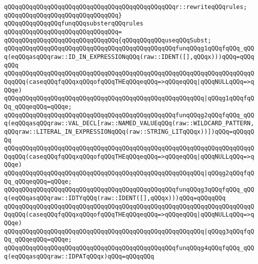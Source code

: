\verb|qQQqqQQqqQQqqQQqqQQqqQQqqQQqqQQqqQQqqQQqqQQqqQQqr::rewriteqQQqrules;|\newline
\verb|qQQqqQQqqQQqqQQqqQQqqQQqqQQqqQQq}|\newline
\newline
\verb|qQQqqQQqqQQqqQQqfunqQQqsubsterqQQqrules|\newline
\verb|qQQqqQQqqQQqqQQqqQQqqQQqqQQqqQQq=|\newline
\verb|qQQqqQQqqQQqqQQqqQQqqQQqqQQqqQQq{qQQqqQQqqQQquseqQQqSubst;|\newline
\newline
\verb|qQQqqQQqqQQqqQQqqQQqqQQqqQQqqQQqqQQqqQQqqQQqqQQqfunqQQqg1qQQqfqQQq_qQQq(eqQQqasqQQqraw::ID_IN_EXPRESSIONqQQq(raw::IDENT([],qQQqx)))qQQq=qQQqqQQq|\newline
\verb|qQQqqQQqqQQqqQQqqQQqqQQqqQQqqQQqqQQqqQQqqQQqqQQqqQQqqQQqqQQqqQQqqQQqqQQqqQQq(caseqQQqfqQQqxqQQqofqQQqTHEqQQqeqQQq=>qQQqeqQQq|\verb#|qQQqNULLqQQq=>qQQqe)#\newline
\verb|qQQqqQQqqQQqqQQqqQQqqQQqqQQqqQQqqQQqqQQqqQQqqQQqqQQqqQQq|\verb#|qQQqg1qQQqfqQQq_qQQqeqQQq=qQQqe;#\newline
\newline
\verb|qQQqqQQqqQQqqQQqqQQqqQQqqQQqqQQqqQQqqQQqqQQqqQQqfunqQQqg2qQQqfqQQq_qQQq(eqQQqasqQQqraw::VAL_DECL[raw::NAMED_VALUEqQQq(raw::WILDCARD_PATTERN,qQQqraw::LITERAL_IN_EXPRESSIONqQQq(raw::STRING_LITqQQqx))])qQQq=qQQqqQQq|\newline
\verb|qQQqqQQqqQQqqQQqqQQqqQQqqQQqqQQqqQQqqQQqqQQqqQQqqQQqqQQqqQQqqQQqqQQqqQQqqQQq(caseqQQqfqQQqxqQQqofqQQqTHEqQQqeqQQq=>qQQqeqQQq|\verb#|qQQqNULLqQQq=>qQQqe)#\newline
\verb|qQQqqQQqqQQqqQQqqQQqqQQqqQQqqQQqqQQqqQQqqQQqqQQqqQQqqQQq|\verb#|qQQqg2qQQqfqQQq_qQQqeqQQq=qQQqe;#\newline
\newline
\verb|qQQqqQQqqQQqqQQqqQQqqQQqqQQqqQQqqQQqqQQqqQQqqQQqfunqQQqg3qQQqfqQQq_qQQq(eqQQqasqQQqraw::IDTYqQQq(raw::IDENT([],qQQqx)))qQQq=qQQqqQQq|\newline
\verb|qQQqqQQqqQQqqQQqqQQqqQQqqQQqqQQqqQQqqQQqqQQqqQQqqQQqqQQqqQQqqQQqqQQqqQQqqQQq(caseqQQqfqQQqxqQQqofqQQqTHEqQQqeqQQq=>qQQqeqQQq|\verb#|qQQqNULLqQQq=>qQQqe)#\newline
\verb|qQQqqQQqqQQqqQQqqQQqqQQqqQQqqQQqqQQqqQQqqQQqqQQqqQQqqQQq|\verb#|qQQqg3qQQqfqQQq_qQQqeqQQq=qQQqe;#\newline
\newline
\verb|qQQqqQQqqQQqqQQqqQQqqQQqqQQqqQQqqQQqqQQqqQQqqQQqfunqQQqg4qQQqfqQQq_qQQq(eqQQqasqQQqraw::IDPATqQQqx)qQQq=qQQqqQQq|\newline
